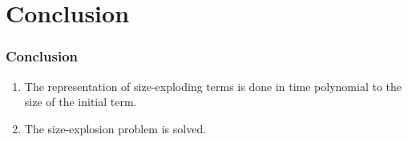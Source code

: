 \documentclass{beamer}
\begin{document}
\section{Conclusion}
\begin{frame}
  \frametitle{Conclusion}
  \begin{enumerate}
    \item The representation of size-exploding terms is done in time polynomial to the size of the initial term.
    \item The size-explosion problem is solved.
  \end{enumerate}
\end{frame}
\end{document}
